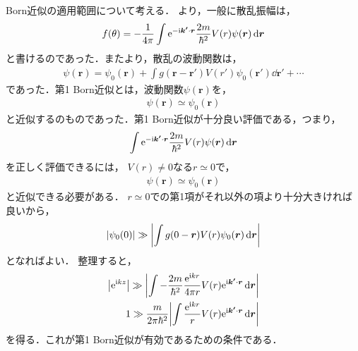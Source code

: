 \documentclass{report}
\begin{document}
  Born近似の適用範囲について考える．
  より，一般に散乱振幅は，
  \begin{align}
    f(\theta) = -\frac{1}{4\pi} \int \mathrm{e}^{-\mathrm{i}\bm{k'}\cdot\bm{r}} \frac{2m}{\hbar^2}V(r)\psi(\bm{r})\dd{\bm{r}}
  \end{align}
  と書けるのであった．またより，散乱の波動関数は，
  \begin{align}
    \psi(\bm{r}) = \psi_0(\bm{r}) + \int g(\bm{r} - \bm{r'}) V(r') \psi_0(\bm{r'}) \dd{\bm{r'}} + \cdots \label{BornWF}
  \end{align}
  であった．第1 Born近似とは，波動関数$\psi(\bm{r})$を，
  \begin{align}
    \psi(\bm{r}) \simeq \psi_0(\bm{r})
  \end{align}
  と近似するのものであった．第1 Born近似が十分良い評価である，つまり，
  \begin{align}
    \int \mathrm{e}^{-\mathrm{i} \bm{k'}\cdot \bm{r}} \frac{2m}{\hbar^2}V(r)\psi(\bm{r})\dd{\bm{r}}
  \end{align}
  を正しく評価できるには，
  $V(r) \neq 0$なる$r\simeq 0$で，
  \begin{align}
    \psi(\bm{r}) \simeq \psi_0(\bm{r})
  \end{align}
  と近似できる必要がある．
  $r \simeq 0$での第1項がそれ以外の項より十分大きければ良いから，
  \begin{align}
    \abs{\psi_0(0)} \gg \abs{\int g(0 - \bm{r}) V(r) \psi_0(\bm{r}) \dd{\bm{r}}}
  \end{align}
  となればよい．
  整理すると，
  \begin{align}
    \abs{\mathrm{e}^{\mathrm{i} kz}} \gg \abs{\int -\frac{2m}{\hbar^2}\frac{\mathrm{e}^{\mathrm{i} kr}}{4\pi r}V(r) \mathrm{e}^{\mathrm{i} \bm{k '}\cdot\bm{r}}\dd{\bm{r}}} \\
    1 \gg \frac{m}{2\pi \hbar^2}\abs{\int \frac{\mathrm{e}^{\mathrm{i} kr}}{r}V(r)\mathrm{e}^{\mathrm{i}\bm{k '}\cdot\bm{r}}\dd{\bm{r}}}\label{BornCondition}
  \end{align}
  を得る．これが第1 Born近似が有効であるための条件である．
\end{document}
